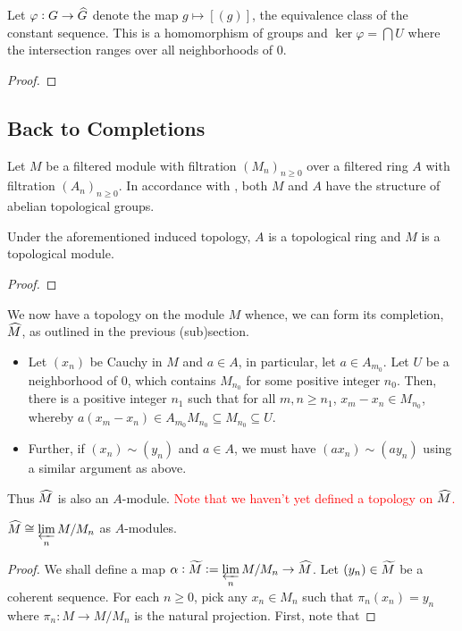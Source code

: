 \begin{proposition}
    Let $\varphi: G\to\widehat{G}$ denote the map $g\mapsto[(g)]$, the equivalence class of the constant sequence. This is a homomorphism of groups and $\ker\varphi = \bigcap U$ where the intersection ranges over all neighborhoods of $0$.
\end{proposition}
\begin{proof}
\end{proof}

\subsection*{Back to Completions}

Let $M$ be a filtered module with filtration $(M_n)_{n\ge 0}$ over a filtered ring $A$ with filtration $(A_n)_{n\ge 0}$. In accordance with , both $M$ and $A$ have the structure of abelian topological groups.

\begin{proposition}
    Under the aforementioned induced topology, $A$ is a topological ring and $M$ is a topological module.
\end{proposition}
\begin{proof}
\end{proof}

We now have a topology on the module $M$ whence, we can form its completion, $\widehat{M}$, as outlined in the previous (sub)section.
\begin{itemize}
    \item Let $(x_n)$ be Cauchy in $M$ and $a\in A$, in particular, let $a\in A_{m_0}$. Let $U$ be a neighborhood of $0$, which contains $M_{n_0}$ for some positive integer $n_0$. Then, there is a positive integer $n_1$ such that for all $m,n\ge n_1$, $x_m - x_n\in M_{n_0}$, whereby $a(x_m - x_n)\in A_{m_0}M_{n_0}\subseteq M_{n_0}\subseteq U$.

    \item Further, if $(x_n)\sim (y_n)$ and $a\in A$, we must have $(ax_n)\sim (ay_n)$ using a similar argument as above.
\end{itemize}

Thus $\widehat{M}$ is also an $A$-module. \textcolor{red}{Note that we haven't yet defined a topology on $\widehat{M}$.}

\begin{proposition}
    $\displaystyle\widehat{M}\cong\varprojlim_n M/M_n$ as $A$-modules.
\end{proposition}
\begin{proof}
    We shall define a map $\displaystyle\alpha: \widetilde{M}:=\varprojlim_{n}M/M_n\to\widehat{M}$. Let $(y_n)\in\widetilde{M}$ be a coherent sequence. For each $n\ge 0$, pick any $x_n\in M_n$ such that $\pi_n(x_n) = y_n$ where $\pi_n: M\to M/M_n$ is the natural projection. First, note that 
\end{proof}

